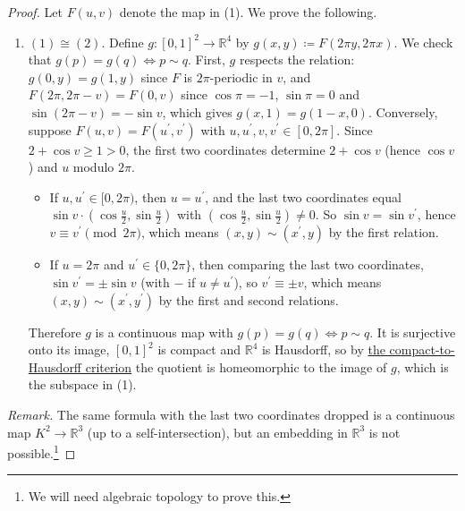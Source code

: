	\begin{proof}
	  Let $F(u, v)$ denote the map in (1). We prove the following. 
		\begin{enumerate}
		  \item $(1) \cong (2)$. Define $g: [0, 1]^2 \rightarrow \mathbb{R}^4$ by $g(x, y) \coloneqq F(2\pi y, 2 \pi x)$. We check that $g(p) = g(q) \iff p \sim q$. First, $g$ respects the relation: $g(0, y) = g(1, y)$ since $F$ is $2\pi$-periodic in $v$, and $F(2\pi, 2\pi - v) = F(0, v)$ since $\cos \pi = -1$, $\sin \pi = 0$ and $\sin(2\pi - v) = -\sin v$, which gives $g(x, 1) = g(1 - x, 0)$. Conversely, suppose $F(u, v) = F(u^\prime, v^\prime)$ with $u, u^\prime, v, v^\prime \in [0, 2\pi]$. Since $2 + \cos v \geq 1 > 0$, the first two coordinates determine $2 + \cos v$ (hence $\cos v$) and $u$ modulo $2\pi$. 
				\begin{itemize}
				  \item If $u, u^\prime \in [0, 2\pi)$, then $u = u^\prime$, and the last two coordinates equal $\sin v \cdot (\cos \frac{u}{2}, \sin \frac{u}{2})$ with $(\cos \frac{u}{2}, \sin \frac{u}{2}) \neq 0$. So $\sin v = \sin v^\prime$, hence $v \equiv v^\prime \pmod{2\pi}$, which means $(x, y) \sim (x^\prime, y)$ by the first relation. 
					\item If $u = 2\pi$ and $u^\prime \in \{0, 2\pi\}$, then comparing the last two coordinates, $\sin v^\prime = \pm \sin v$ (with $-$ if $u \neq u^\prime$), so $v^\prime \equiv \pm v$, which means $(x, y) \sim (x^\prime, y^\prime)$ by the first and second relations. 
				\end{itemize}
				Therefore $g$ is a continuous map with $g(p) = g(q) \iff p \sim q$. It is surjective onto its image, $[0, 1]^2$ is compact and $\mathbb{R}^4$ is Hausdorff, so by \hyperref[thm:compact_hausdorff_quotient]{the compact-to-Hausdorff criterion} the quotient is homeomorphic to the image of $g$, which is the subspace in (1). 
		\end{enumerate}
		\textit{Remark.} The same formula with the last two coordinates dropped is a continuous map $K^2 \rightarrow \mathbb{R}^3$ (up to a self-intersection), but an embedding in $\mathbb{R}^3$ is not possible.\footnote{We will need algebraic topology to prove this.} 
	\end{proof}

